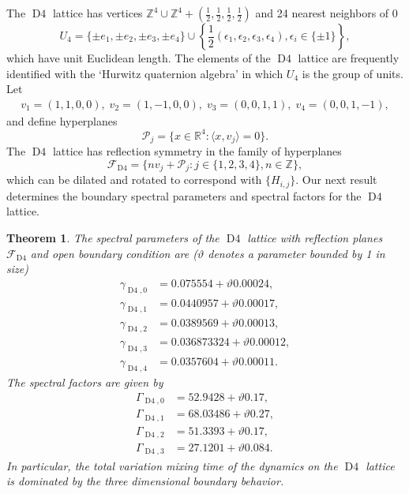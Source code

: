 \documentclass[a4paper, 12pt, notitlepage]{amsart}
\newcommand{\Dfour}{\operatorname{D4}}
\newcommand{\bR}{\mathbb{R}}
\newcommand{\zed}{\mathbb{Z}}
\newcommand{\sF}{\mathscr{F}}
\newcommand{\sP}{{\mathscr{P}}}
\newtheorem{theorem}{Theorem}
\theoremstyle{remark}
\begin{document}
 
The $\Dfour$ lattice has vertices $\zed^4 \cup \zed^4 + (\frac{1}{2}, \frac{1}{2}, \frac{1}{2}, \frac{1}{2})$ and 24 nearest neighbors of 0
\begin{equation}
U_4 = \{ \pm e_1, \pm e_2, \pm e_3 , \pm e_4\} \cup \left\{\frac{1}{2} (\epsilon_1, \epsilon_2, \epsilon_3, \epsilon_4), \epsilon_i \in \{\pm 1\}\right\},
\end{equation}
which have unit Euclidean length. The elements of the $\Dfour$ lattice are frequently identified with the `Hurwitz quaternion algebra' in which $U_4$ is the group of units.
 Let 
\begin{align*}v_1=(1,1,0,0),\; v_2=(1,-1,0,0),\; v_3 = (0,0,1,1),\; v_4 = (0,0,1,-1),
\end{align*}
 and define hyperplanes
\begin{equation*}
 \sP_j = \{x \in \bR^4: \langle x, v_j\rangle =0\}.
\end{equation*}
The $\Dfour$ lattice has reflection symmetry in the  family of hyperplanes
\begin{equation}
 \sF_{\Dfour} = \{ n v_j + \sP_j: j \in \{1, 2, 3, 4\}, n \in \zed\},
\end{equation}
which can be dilated and rotated to correspond with $\{H_{i,j}\}$.
Our next result determines the boundary spectral parameters and spectral factors for the $\Dfour$ lattice.

\begin{theorem}\label{D4_theorem}
The spectral parameters of the $\Dfour$ lattice with reflection planes $\sF_{\Dfour}$ and open boundary condition are ($\vartheta$ denotes a parameter bounded by 1 in size)
\begin{align*}
\gamma_{\Dfour, 0} &= 0.075554+ \vartheta 0.00024, \\
\gamma_{\Dfour, 1} &= 0.0440957 +\vartheta 0.00017, \\
\gamma_{\Dfour, 2} &= 0.0389569 +\vartheta 0.00013, \\
\gamma_{\Dfour, 3} &= 0.036873324 +\vartheta 0.00012, \\
\gamma_{\Dfour, 4} &= 0.0357604+ \vartheta 0.00011.
\end{align*}
The spectral factors are given by
\begin{align*}
 \Gamma_{\Dfour,0}  &= 52.9428 + \vartheta 0.17,\\
 \Gamma_{\Dfour,1}  &= 68.03486+ \vartheta 0.27,\\
 \Gamma_{\Dfour,2}  &=  51.3393 + \vartheta 0.17,\\
 \Gamma_{\Dfour,3}  &= 27.1201 + \vartheta 0.084.
\end{align*}
In particular, the total variation mixing time of the dynamics on the $\Dfour$ lattice is dominated by the three dimensional boundary behavior.
\end{theorem}
\end{document}
